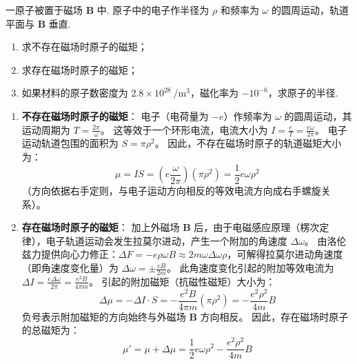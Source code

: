 \begin{exercise}\label{ex:19.1}
一原子被置于磁场 $\boldsymbol{B}$ 中. 原子中的电子作半径为 $\rho$ 和频率为 $\omega$ 的圆周运动，轨道平面与 $\boldsymbol{B}$ 垂直. 
\begin{enumerate}
  \item[(a)] 求不存在磁场时原子的磁矩；
  \item[(b)] 求存在磁场时原子的磁矩；
  \item[(c)] 如果材料的原子数密度为 $2.8 \times 10^{28} \ \mathrm{/m^3}$，磁化率为 $-10^{-6}$，求原子的半径.
\end{enumerate}
\end{exercise}
\begin{solution}
\begin{enumerate}
    \item[(a)] \textbf{不存在磁场时原子的磁矩}：
    电子（电荷量为 $-e$）作频率为 $\omega$ 的圆周运动，其运动周期为 $T = \frac{2\pi}{\omega}$。
    这等效于一个环形电流，电流大小为 $I = \frac{e}{T} = \frac{e\omega}{2\pi}$。
    电子运动轨道包围的面积为 $S = \pi \rho^2$。
    因此，不存在磁场时原子的轨道磁矩大小为：
    $$ \mu = I S = \left( e \frac{\omega}{2\pi} \right) \left( \pi \rho^2 \right) = \frac{1}{2} e \omega \rho^2 $$
    （方向依据右手定则，与电子运动方向相反的等效电流方向成右手螺旋关系）。

    \item[(b)] \textbf{存在磁场时原子的磁矩}：
    加上外磁场 $\boldsymbol{B}$ 后，由于电磁感应原理（楞次定律），电子轨道运动会发生拉莫尔进动，产生一个附加的角速度 $\Delta \omega$。
    由洛伦兹力提供向心力修正：$\Delta F = -e \rho \omega B \approx 2m\omega \Delta \omega \rho$，可解得拉莫尔进动角速度（即角速度变化量）为 $\Delta \omega = \pm \frac{eB}{2m}$。
    此角速度变化引起的附加等效电流为 $\Delta I = \frac{e \Delta \omega}{2\pi} = \frac{e^2 B}{4\pi m}$。
    引起的附加磁矩（抗磁性磁矩）大小为：
    $$ \Delta \mu = - \Delta I \cdot S = - \frac{e^2 B}{4\pi m} (\pi \rho^2) = - \frac{e^2 \rho^2}{4m} B $$
    负号表示附加磁矩的方向始终与外磁场 $\boldsymbol{B}$ 方向相反。
    因此，存在磁场时原子的总磁矩为：
    $$ \mu' = \mu + \Delta \mu = \frac{1}{2} e \omega \rho^2 - \frac{e^2 \rho^2}{4m} B $$


\end{enumerate}
\end{solution}
